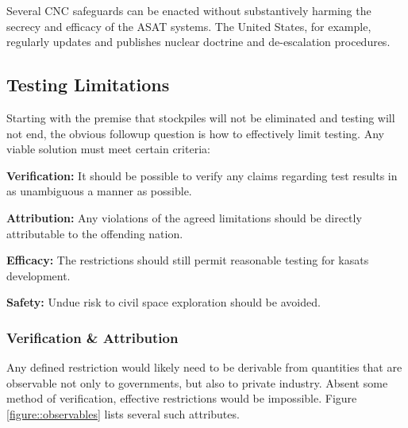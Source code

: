 Several CNC safeguards can be enacted without substantively harming
the secrecy and efficacy of the ASAT systems.  The United States, for
example, regularly updates and publishes nuclear doctrine and
de-escalation procedures.\cite[What to cite for this one??? Ask
  foster]{xxx}

\subsection{Testing Limitations}
Starting with the premise that stockpiles will not be eliminated and
testing will not end, the obvious followup question is how to
effectively limit testing.  Any viable solution must meet certain
criteria:

\textbf{Verification:} It should be possible to verify any claims
regarding test results in as unambiguous a manner as possible.

\textbf{Attribution:} Any violations of the agreed limitations should
be directly attributable to the offending nation.

\textbf{Efficacy:} The restrictions should still permit reasonable
testing for \acp{kasat} development.

\textbf{Safety:} Undue risk to civil space exploration should be
avoided.

\subsubsection{Verification \& Attribution}
Any defined restriction would likely need to be derivable from
quantities that are observable not only to governments, but also to
private industry.  Absent some method of verification, effective
restrictions would be impossible.  Figure \ref{figure::observables}
lists several such attributes.

